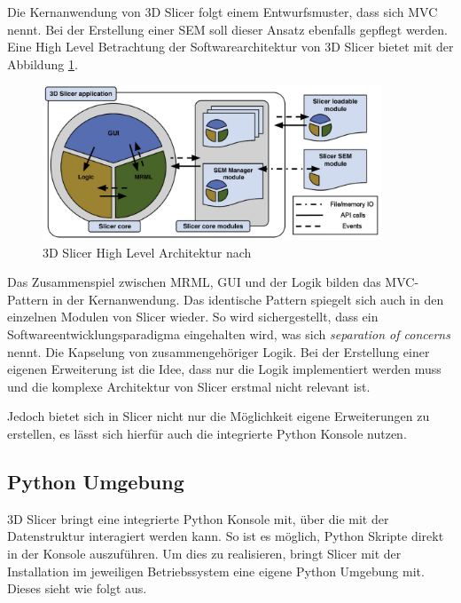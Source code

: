 Die Kernanwendung von 3D Slicer folgt einem Entwurfsmuster, dass sich \ac{MVC} nennt.
Bei der Erstellung einer \ac{SEM} soll dieser Ansatz ebenfalls gepflegt werden.
Eine High Level Betrachtung der Softwarearchitektur von 3D Slicer bietet
\cite[Seite 1332]{fedorov2012slicer} mit der Abbildung
\ref{fig:3d_slicer_architektur}.

\begin{figure}[h]
	\centering
	\includegraphics[width=0.9\textwidth]{img/3d_slicer_architektur.jpg}
	\caption{3D Slicer High Level Architektur nach \citet[S.~25]{fedorov2012slicer}}
	\label{fig:3d_slicer_architektur}
\end{figure}

Das Zusammenspiel zwischen \ac{MRML}, \ac{GUI} und der Logik bilden das MVC-Pattern
in der Kernanwendung. Das identische Pattern spiegelt sich auch in den einzelnen
Modulen von Slicer wieder. So wird sichergestellt, dass ein Softwareentwicklungsparadigma
eingehalten wird, was sich \textit{separation of concerns} nennt. Die Kapselung
von zusammengehöriger Logik. Bei der Erstellung einer eigenen Erweiterung ist die
Idee, dass nur die Logik implementiert werden muss und die komplexe Architektur
von Slicer erstmal nicht relevant ist.

Jedoch bietet sich in Slicer nicht nur die Möglichkeit eigene Erweiterungen zu
erstellen, es lässt sich hierfür auch die integrierte Python Konsole nutzen.

\subsection{Python Umgebung}
\label{subsec:pythob_umgebung} 3D Slicer bringt eine integrierte Python Konsole mit,
über die mit der Datenstruktur interagiert werden kann. So ist es möglich,
Python Skripte direkt in der Konsole auszuführen. Um dies zu realisieren, bringt
Slicer mit der Installation im jeweiligen Betriebssystem eine eigene Python
Umgebung mit. Dieses sieht wie folgt aus.

